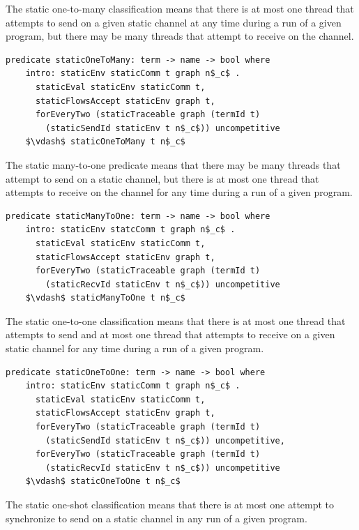 \documentclass[letterpaper, 11pt]{report}
\begin{document}
The static one-to-many classification means that there is at most one thread that attempts to
send on a given static channel at any time during a run of a given program, but there may be
many threads that attempt to receive on the channel.

\begin{lstlisting}[language=logic, mathescape]
  predicate staticOneToMany: term -> name -> bool where
    intro: staticEnv staticComm t graph n$_c$ .
      staticEval staticEnv staticComm t,
      staticFlowsAccept staticEnv graph t,
      forEveryTwo (staticTraceable graph (termId t)
        (staticSendId staticEnv t n$_c$)) uncompetitive
    $\vdash$ staticOneToMany t n$_c$
\end{lstlisting}

The static many-to-one predicate means
that there may be many threads that attempt to send on a static channel, but there is at most
one thread that attempts to receive on the channel for any time during a run of a given
program.

\begin{lstlisting}[language=logic, mathescape]
  predicate staticManyToOne: term -> name -> bool where
    intro: staticEnv statcComm t graph n$_c$ .
      staticEval staticEnv staticComm t,
      staticFlowsAccept staticEnv graph t,
      forEveryTwo (staticTraceable graph (termId t)
        (staticRecvId staticEnv t n$_c$)) uncompetitive
    $\vdash$ staticManyToOne t n$_c$
\end{lstlisting}

The static one-to-one classification means that there is at most one thread that attempts to
send and at most one thread that attempts to receive on a given static channel for any time
during a run of a given program.

\begin{lstlisting}[language=logic, mathescape]
  predicate staticOneToOne: term -> name -> bool where
    intro: staticEnv staticComm t graph n$_c$ .
      staticEval staticEnv staticComm t,
      staticFlowsAccept staticEnv graph t,
      forEveryTwo (staticTraceable graph (termId t)
        (staticSendId staticEnv t n$_c$)) uncompetitive, 
      forEveryTwo (staticTraceable graph (termId t)
        (staticRecvId staticEnv t n$_c$)) uncompetitive
    $\vdash$ staticOneToOne t n$_c$
\end{lstlisting}

The static one-shot classification means that there is at most one attempt
to synchronize to send on a static channel in any run of a given program.
\end{document}
